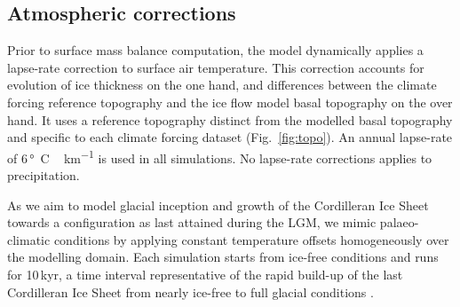 
\subsection{Atmospheric corrections}

Prior to surface mass balance computation, the model dynamically applies a lapse-rate correction to surface air temperature. This correction accounts for evolution of ice thickness on the one hand, and differences between the climate forcing reference topography and the ice flow model basal topography on the over hand. It uses a reference topography distinct from the modelled basal topography and specific to each climate forcing dataset (Fig.~\ref{fig:topo}). An annual lapse-rate of 6\,\unit{\degree C\,km^{-1}} is used in all simulations. No lapse-rate corrections applies to precipitation.

As we aim to model glacial inception and growth of the Cordilleran Ice Sheet towards a configuration as last attained during the LGM, we mimic palaeo-climatic conditions by applying constant temperature offsets homogeneously over the modelling domain. Each simulation starts from ice-free conditions and runs for 10\,kyr, a time interval representative of the rapid build-up of the last Cordilleran Ice Sheet from nearly ice-free to full glacial conditions \citep{clague-1989,stroeven-etal-2010}.
